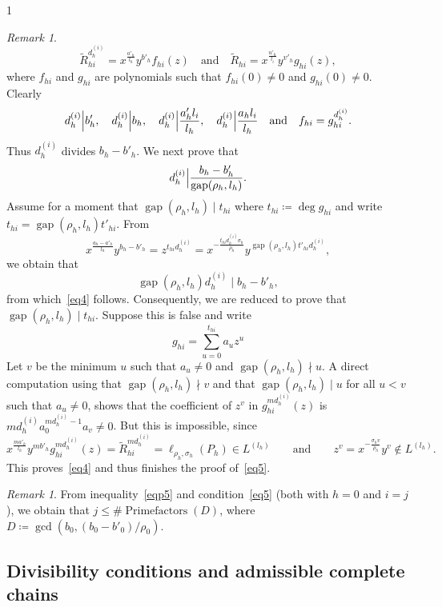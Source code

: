 \documentclass[reqno,a4paper,twoside]{amsart}
\theoremstyle{definition}
\theoremstyle{remark}
\newtheorem{remark}[theorem]{Remark}
\DeclareMathOperator{\gap}{gap}
\DeclareMathOperator{\Primefactors}{Prime factors}
\begin{document}
\begin{spacing}{1}
\begin{remark}
$$
\widetilde R_{hi}^{d_h^{(i)}} = x^{\frac{a'_h}{l_h}}y^{b'_h}f_{hi}(z)\quad\text{and}\quad \widetilde R_{hi} = x^{\frac{u'_h}{l_i}} y^{v'_h} g_{hi}(z),
$$
where $f_{hi}$ and $g_{hi}$ are polynomials such that $f_{hi}(0)\ne 0$ and $g_{hi}(0)\ne 0$. Clearly
\vspace{1pt}
\begin{equation}\label{eq3}
d_h^{(i)}\Bigl| b'_h,\quad d_h^{(i)}\Bigl| b_h,\quad d_h^{(i)}\Bigl| \frac{a'_hl_i}{l_h},\quad d_h^{(i)}\Bigl| \frac{a_hl_i}{l_h}\quad \text{and}\quad f_{hi} = g_{hi}^{d_h^{(i)}}.
\vspace{1pt}
\end{equation}
Thus $d_h^{(i)}$ divides $b_h-b'_h$. We next prove that
\begin{equation}\label{eq4}
d_h^{(i)}\Bigl|\frac{b_h-b'_h}{\gap(\rho_h,l_h)}.
\end{equation}
Assume for a moment that $\gap(\rho_h,l_h)\mid t_{hi}$ where $t_{hi}\coloneqq \deg g_{hi}$ and write $t_{hi} = \gap(\rho_h,l_h) t'_{hi}$. From
$$
x^{\frac{a_h-a'_h}{l_h}}y^{b_h-b'_h} = z^{t_{hi}d_h^{(i)}} = x^{-\frac{t_{hi}d_h^{(i)}\sigma_h}{\rho_h}} y^{\gap(\rho_h,l_h) t'_{hi} d_h^{(i)}},
$$
we obtain that
$$
\gap(\rho_h,l_h) d_h^{(i)}\mid b_h-b'_h,
$$
from which~\eqref{eq4} follows. Consequently, we are reduced to prove that $\gap(\rho_h,l_h)\mid t_{hi}$. Suppose this is false and write
$$
g_{hi} = \sum_{u=0}^{t_{hi}} a_uz^u
$$
Let $v$ be the minimum $u$ such that $a_u\ne 0$ and $\gap(\rho_h,l_h)\nmid u$. A direct computation using that $\gap(\rho_h,l_h)\nmid v$ and that $\gap(\rho_h,l_h)\mid u$ for all $u<v$ such that $a_u\ne 0$, shows that the coefficient of $z^v$ in $g_{hi}^{md_h^{(i)}}(z)$ is $md_h^{(i)}a_0^{md_h^{(i)}-1}a_v\ne 0$. But this is impossible, since
$$
x^{\frac{ma'_h}{l_h}}y^{mb'_h} g_{hi}^{md_h^{(i)}}(z)
=\widetilde R_{hi}^{md_h^{(i)}} = \ell_{\rho_h,\sigma_h}(P_h)\in L^{(l_h)}\qquad\text{and}\qquad z^v = x^{-\frac{\sigma_h v}{\rho_h}} y^v\notin L^{(l_h)}.
$$
This proves~\eqref{eq4} and thus finishes the proof of~\eqref{eq5}.
\end{remark}


\begin{remark} From inequality~\eqref{eqp5} and condition~\eqref{eq5} (both with $h=0$ and $i=j$), we obtain that $j\le \# \Primefactors(D)$, where $D\coloneqq \gcd(b_0,(b_0-b'_0)/\rho_0)$.
\end{remark}

\subsection{Divisibility conditions and admissible complete chains}


\end{spacing}
\end{document}
